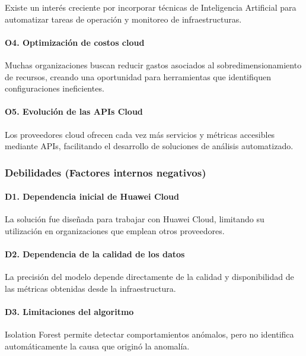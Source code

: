 Existe un interés creciente por incorporar técnicas de Inteligencia Artificial para automatizar tareas de operación y monitoreo de infraestructuras.

\paragraph*{O4. Optimización de costos cloud}

Muchas organizaciones buscan reducir gastos asociados al sobredimensionamiento de recursos, creando una oportunidad para herramientas que identifiquen configuraciones ineficientes.

\paragraph*{O5. Evolución de las APIs Cloud}

Los proveedores cloud ofrecen cada vez más servicios y métricas accesibles mediante APIs, facilitando el desarrollo de soluciones de análisis automatizado.

\subsubsection{Debilidades (Factores internos negativos)}

\paragraph*{D1. Dependencia inicial de Huawei Cloud}

La solución fue diseñada para trabajar con Huawei Cloud, limitando su utilización en organizaciones que emplean otros proveedores.

\paragraph*{D2. Dependencia de la calidad de los datos}

La precisión del modelo depende directamente de la calidad y disponibilidad de las métricas obtenidas desde la infraestructura.

\paragraph*{D3. Limitaciones del algoritmo}

Isolation Forest permite detectar comportamientos anómalos, pero no identifica automáticamente la causa que originó la anomalía.

